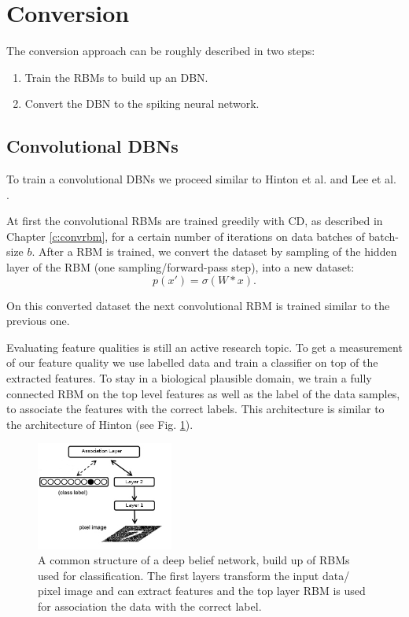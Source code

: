 \section{Conversion} \label{c:convappro}

The conversion approach can be roughly described in two steps:
\begin{enumerate}
\item Train the RBMs to build up an DBN.
\item Convert the DBN to the spiking neural network.
\end{enumerate}


\subsection{Convolutional DBNs} \label{c:convdbns}

To train a convolutional DBNs we proceed similar to Hinton et al. and Lee et al. \cite{hinton2006fast} \cite{lee2009convolutional}.

At first the convolutional RBMs are trained greedily with CD, as described in Chapter \ref{c:convrbm}, for a certain number of iterations on data batches of batch-size $b$.
After a RBM is trained, we convert the dataset by sampling of the hidden layer of the RBM (one sampling/forward-pass step), into a new dataset:
\[
p(x') = \sigma(W * x) .
\]

On this converted dataset the next convolutional RBM is trained similar to the previous one.

Evaluating feature qualities is still an active research topic.
To get a measurement of our feature quality we use labelled data and train a classifier on top of the extracted features.
To stay in a biological plausible domain, we train a fully connected RBM on the top level features as well as the label of the data samples, to associate the features with the correct labels.
This architecture is similar to the architecture of Hinton \cite{hinton2006fast} (see Fig. \ref{fig:dbnmnist}).

\begin{figure}
	\centering
    	\includegraphics[width=0.4\textwidth]{imgs/dbn_mnist.png} 
    \caption{A common structure of a deep belief network, build up of RBMs used for classification. The first layers transform the input data/ pixel image and can extract features and the top layer RBM is used for association the data with the correct label.}
	\label{fig:dbnmnist}
\end{figure}

